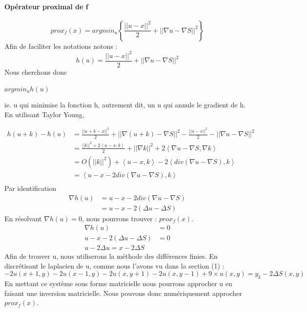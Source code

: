 \paragraph{Opérateur proximal de f}
\begin{equation*}
prox_f(x) = argmin_u\left\{\frac{||u-x||^2}{2}+||\nabla u -\nabla S ||^2 \right\}
\end{equation*}
Afin de faciliter les notations notons :
\begin{equation*}
h(u) = \frac{||u-x||^2}{2}+||\nabla u -\nabla S ||^2
\end{equation*} 
Nous cherchons donc 
\begin{center}
$argmin_u h(u)$
\end{center}
ie. u qui minimise la fonction h, autrement dit, un u qui annule le gradient de h.\\
En utilisant Taylor Young, 

\begin{equation*}
\begin{aligned}
h(u+k) -h(u) &= \frac{||u+k-x||^2}{2}+||\nabla  (u+k) -\nabla S ||^2- \frac{||u-x||^2}{2}-||\nabla u -\nabla S ||^2\\
& = \frac{||k||^2+2\left<u-x,k\right>}{2}+||\nabla k||^2+2\left<\nabla u-\nabla S, \nabla k\right>\\
& = O(||k||^2)+\left<u-x,k\right>-2\left<div(\nabla u-\nabla S), k\right>\\
& = \left<u-x-2div(\nabla u-\nabla S), k\right>\\
\end{aligned}
\end{equation*}
Par identification 
\begin{equation*}
\begin{aligned}
\nabla h(u) &= u-x-2div(\nabla u - \nabla S)\\
& = u-x-2(\Delta u -\Delta S)
\end{aligned}
\end{equation*}
En résolvant $\nabla h(u) = 0$, nous pourrons trouver  : $prox_f(x) $. \\	
	\begin{equation*}
		\begin{aligned}
		\nabla h(u) &= 0\\
		u-x-2(\Delta u -\Delta S) & =0\\
		u-2\Delta u = x-2\Delta S
		\end{aligned}
\end{equation*}
Afin de trouver u, nous utiliserons la méthode des différences finies. En discrétisant le laplacien de u, comme nous l'avons vu dans la section (1) : 
\begin{equation*}
 -2u(x+1,y) -2 u(x-1,y)-2u(x,y+1) -2 u(x,y-1) +9\times u(x,y) =  y_k-  2\Delta S(x,y)
\end{equation*}
En mettant ce système sous forme matricielle nous pourrons approcher u en faisant une inversion matricielle. 
Nous pouvons donc numériquement approcher $prox_f(x)$.

